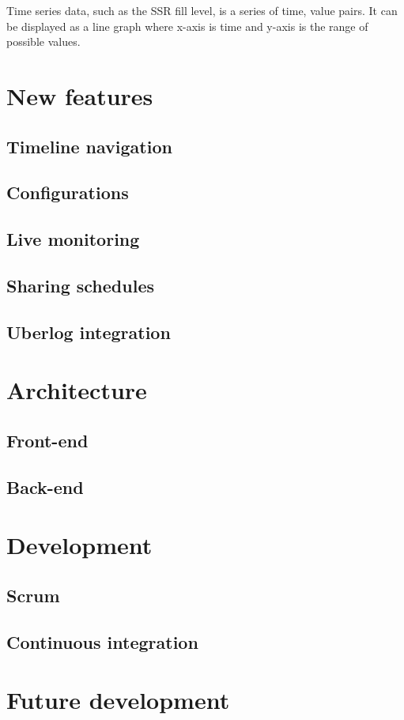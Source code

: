 Time series data, such as the SSR fill level, is a series of time, value pairs. It can be displayed as a line graph where x-axis is time and y-axis is the range of possible values.

\section{New features}
\subsection{Timeline navigation}
\subsection{Configurations}
\subsection{Live monitoring}
\subsection{Sharing schedules}
\subsection{Uberlog integration}
\section{Architecture}
\subsection{Front-end}
\subsection{Back-end}
\section{Development}
\subsection{Scrum}
\subsection{Continuous integration}
\section{Future development}